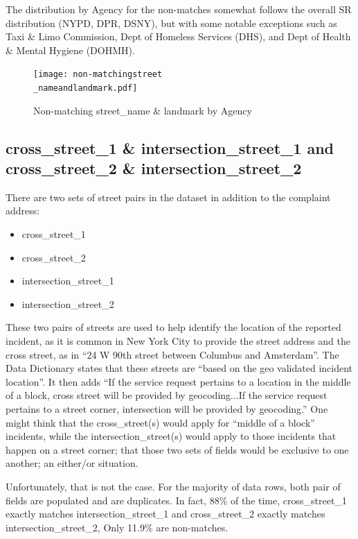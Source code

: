 \documentclass[12pt, titlepage]{article}
\begin{document}
{The distribution by Agency for the non-matches somewhat follows 
the overall SR distribution (NYPD, DPR, DSNY), but with some notable 
exceptions such as Taxi \& Limo Commission, Dept of Homeless 
Services (DHS), and Dept of Health \& Mental Hygiene (DOHMH).

\begin{figure}[tbp]
		\centering
		\texttt{[image: non-matchingstreet\\\_nameandlandmark.pdf]}
		\caption{Non-matching street\_name \& landmark by Agency}
		\label{fig:landmarkchart}
	\end{figure}	
	
	
\subsection{cross\_street\_1 \& intersection\_street\_1 and cross\_street\_2 
\& intersection\_street\_2} There are two sets of street pairs in the 
dataset in addition to the complaint address:

	\begin{itemize}
		\item cross\_street\_1
		\item cross\_street\_2
		\item intersection\_street\_1
		\item intersection\_street\_2
	\end{itemize}
	
These two pairs of streets are used to help identify the location of the 
reported incident, as it is common in New York City to provide the 
street address and the cross street, as in ``24 W 90th street between 
Columbus and Amsterdam''. The Data Dictionary states that these 
streets are ``based on the geo validated incident location''. It then 
adds ``If the service request pertains to a location in the middle of a 
block, cross street will be provided by geocoding...If the service 
request pertains to a street corner, intersection will be provided by 
geocoding.''  One might think that the cross\_street(s) would apply 
for ``middle of a block'' incidents, while the intersection\_street(s) 
would apply to those incidents that happen on a street corner; 
that those two sets of fields would be exclusive to one another; 
an either/or situation. 

Unfortunately, that is not the case. For the majority of data rows, both 
pair of fields are populated and are duplicates. In fact, 88\% of the 
time, cross\_street\_1 exactly matches intersection\_street\_1 and 
cross\_street\_2 exactly matches intersection\_street\_2, Only 
11.9\% are non-matches.

}
\end{document}
